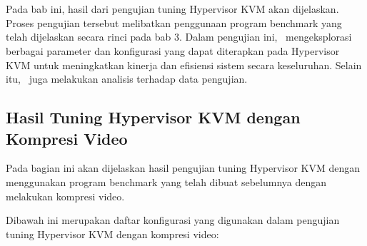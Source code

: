 \chapter{\babEmpat}
Pada bab ini, hasil dari pengujian tuning Hypervisor KVM akan dijelaskan. Proses pengujian tersebut melibatkan penggunaan program benchmark yang telah dijelaskan secara rinci pada bab 3. Dalam pengujian ini, \saya\ mengeksplorasi berbagai parameter dan konfigurasi yang dapat diterapkan pada Hypervisor KVM untuk meningkatkan kinerja dan efisiensi sistem secara keseluruhan. Selain itu, \saya\ juga melakukan analisis terhadap data pengujian.

\section{Hasil Tuning Hypervisor KVM dengan Kompresi Video}
Pada bagian ini akan dijelaskan hasil pengujian tuning Hypervisor KVM dengan menggunakan program benchmark yang telah dibuat sebelumnya dengan melakukan kompresi video.

Dibawah ini merupakan daftar konfigurasi yang digunakan dalam pengujian tuning Hypervisor KVM dengan kompresi video:

